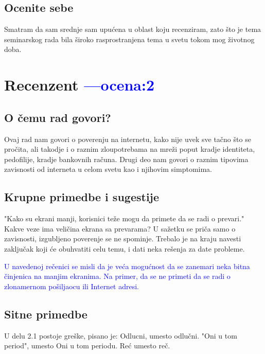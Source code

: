 \documentclass[a4paper]{report}
\newcommand{\odgovor}[1]{\textcolor{blue}{#1}}
\begin{document}
\section{Ocenite sebe}
Smatram da sam srednje sam upućena u oblast koju recenziram, zato što je tema seminarskog rada bila široko rasprostranjena tema u svetu tokom mog životnog doba.

\chapter{Recenzent \odgovor{---ocena:2} }


\section{O čemu rad govori?}


Ovaj rad nam govori o poverenju na internetu, kako nije uvek sve tačno što se pročita, ali takodje i o raznim zloupotrebama na mreži poput kradje identiteta, pedofilije, kradje bankovnih računa. Drugi deo nam govori o raznim tipovima zavisnosti od interneta u celom svetu kao i njihovim simptomima.

\section{Krupne primedbe i sugestije}
"Kako su ekrani manji, korisnici teže mogu da primete da se radi o prevari." Kakve veze ima veličina ekrana sa prevarama?
U sažetku se priča samo o zavisnosti, izgubljeno poverenje se ne spominje. Trebalo je na kraju navesti zaključak koji će obuhvatiti celu temu, i dati neka rešenja za date probleme. 

\odgovor{U navedenoj rečenici se misli da je veća mogućnost da se zanemari neka bitna činjenica na manjim ekranima. Na primer, da se ne primeti da se radi o zlonamernom pošiljaocu ili Internet adresi.}
\section{Sitne primedbe}
U delu 2.1 postoje greške, pisano je:
Odlucni, umesto odlučni.
"Oni u tom period", umesto Oni u tom periodu.
Reć umesto reč.
\end{document}
